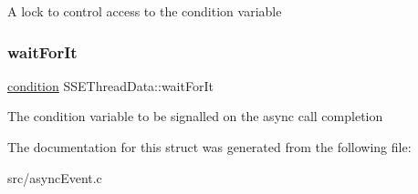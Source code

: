 A lock to control access to the condition variable \mbox{\label{structSSEThreadData_a2c1ad330fd390938be8ef292fee4df82}} 
\subsubsection{\texorpdfstring{wait\+For\+It}{waitForIt}}
{\footnotesize\ttfamily \hyperlink{queue_8h_a18a0de1af5a8524b75bf94d6b14701b4}{condition} S\+S\+E\+Thread\+Data\+::wait\+For\+It}

The condition variable to be signalled on the async call completion 

The documentation for this struct was generated from the following file\+:\begin{DoxyCompactItemize}
\item 
src/async\+Event.\+c\end{DoxyCompactItemize}
